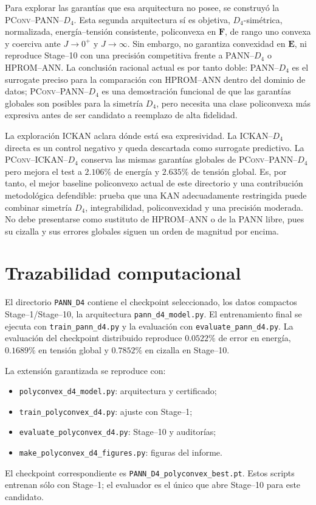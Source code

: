 \documentclass[11pt,a4paper]{article}
\newcommand{\E}{\ensuremath{\bm E}}
\newcommand{\F}{\ensuremath{\bm F}}
\newcommand{\Dfour}{\ensuremath{D_4}}
\newcommand{\PANN}{\textsc{PANN--}\Dfour}
\newcommand{\PConvPANN}{\textsc{PConv--PANN--}\Dfour}
\newcommand{\ICKAN}{\textsc{ICKAN--}\Dfour}
\newcommand{\PConvICKAN}{\textsc{PConv--ICKAN--}\Dfour}
\begin{document}
Para explorar las garantías que esa arquitectura no posee, se construyó la
\PConvPANN{}. Esta segunda arquitectura sí es objetiva, \(\Dfour\)-simétrica,
normalizada, energía--tensión consistente, policonvexa en \(\F\), de rango
uno convexa y coerciva ante \(J\to0^+\) y \(J\to\infty\). Sin embargo, no
garantiza convexidad en \(\E\), ni reproduce Stage--10 con una precisión
competitiva frente a \PANN{} o HPROM--ANN. La conclusión racional actual es
por tanto doble: \PANN{} es el surrogate preciso para la comparación con
HPROM--ANN dentro del dominio de datos; \PConvPANN{} es una demostración
funcional de que las garantías globales son posibles para la simetría \(\Dfour\),
pero necesita una clase policonvexa más expresiva antes de ser candidato a
reemplazo de alta fidelidad.

La exploración ICKAN aclara dónde está esa expresividad. La \ICKAN{} directa
es un control negativo y queda descartada como surrogate predictivo. La
\PConvICKAN{} conserva las mismas garantías globales de \PConvPANN{} pero
mejora el test a \(2.106\%\) de energía y \(2.635\%\) de tensión global.
Es, por tanto, el mejor baseline policonvexo actual de este directorio y una
contribución metodológica defendible: prueba que una KAN adecuadamente
restringida puede combinar simetría \(\Dfour\), integrabilidad,
policonvexidad y una precisión moderada. No debe presentarse como sustituto
de HPROM--ANN o de la PANN libre, pues su cizalla y sus errores globales siguen
un orden de magnitud por encima.

\section*{Trazabilidad computacional}

El directorio \texttt{PANN\_D4} contiene el checkpoint seleccionado, los datos
compactos Stage--1/Stage--10, la arquitectura
\texttt{pann\_d4\_model.py}. El entrenamiento final se ejecuta con
\texttt{train\_pann\_d4.py} y la evaluación con
\texttt{evaluate\_pann\_d4.py}. La evaluación del checkpoint distribuido
reproduce \(0.0522\%\) de error en energía, \(0.1689\%\) en tensión global y
\(0.7852\%\) en cizalla en Stage--10.

La extensión garantizada se reproduce con:
\begin{itemize}
\item \texttt{polyconvex\_d4\_model.py}: arquitectura y certificado;
\item \texttt{train\_polyconvex\_d4.py}: ajuste con Stage--1;
\item \texttt{evaluate\_polyconvex\_d4.py}: Stage--10 y auditorías;
\item \texttt{make\_polyconvex\_d4\_figures.py}: figuras del informe.
\end{itemize}
El checkpoint correspondiente es
\texttt{PANN\_D4\_polyconvex\_best.pt}. Estos scripts entrenan sólo con
Stage--1; el evaluador es el único que abre Stage--10 para este candidato.
\end{document}
